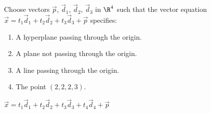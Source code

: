 \begin{exercises}
\begin{problist}
		\prob Choose vectors $\vec p$, $\vec d_{1}$, $\vec d_{2}$,
		$\vec d_{3}$ in $\R^{4}$ such that the vector equation
		$\vec x = t_{1}\vec d_{1} + t_{2}\vec d_{2} + t_{3}\vec d_{3}+\vec p$ specifies:
		\begin{enumerate}
			\item A hyperplane passing through the origin.
			
			\item A plane not passing through the origin.
			
			\item A line passing through the origin.
			
			\item The point $(2,2,2,3)$.
		\end{enumerate}
		\begin{solution}
			$\vec {x} = t_{1}\vec {d}_{1}+t_{2}\vec {d}_{2}+t_{3}\vec {d}_{3}+t_{4}\vec {d}_{4}+\vec {p}$
\end{solution}
\end{problist}
\end{exercises}
